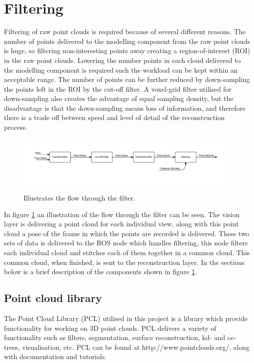 \section{Filtering}
Filtering of raw point clouds is required because of several different reasons. The number of points delivered to the modelling component from the raw point clouds is huge, so filtering non-interesting points away creating a region-of-interest (ROI) in the raw point clouds. Lowering the number points in each cloud delivered to the modelling component is required such the workload can be kept within an acceptable range. The number of points can be further reduced by down-sampling the points left in the ROI by the cut-off filter. A voxel-grid filter utilised for down-sampling also creates the advantage of equal sampling density, but the disadvantage is that the down-sampling means loss of information, and therefore there is a trade off between speed and level of detail of the reconstruction process.  

\begin{figure}[htb]
	\begin{center}
		\includegraphics[scale=0.6,trim=20 70 0 20]{graphics/07_modelling/FilterFlow.pdf}%
		\caption{Illustrates the flow through the filter.}
		\label{fig:filter_flow}
	\end{center}
\end{figure}

In figure \ref{fig:filter_flow} an illustration of the flow through the filter can be seen. The vision layer is delivering a point cloud for each individual view, along with this point cloud a pose of the frame in which the points are recorded is delivered. These two sets of data is delivered to the ROS node which handles filtering, this node filters each individual cloud and stitches each of them together in a common cloud. This common cloud, when finished, is sent to the reconstruction layer. In the sections below is a brief description of the components shown in figure \ref{fig:filter_flow}. 

\subsection{Point cloud library}
The Point Cloud Library (PCL) utilised in this project is a library which provide functionality for working on 3D point clouds. PCL delivers a variety of functionality such as filters, segmentation, surface reconstruction, kd- and oc-trees, visualisation, etc. PCL can be found at http://www.pointclouds.org/, along with documentation and tutorials.

